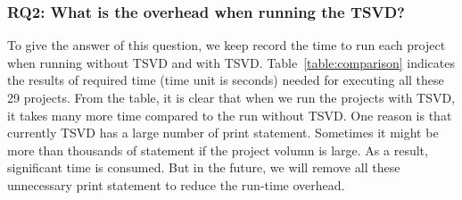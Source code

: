 \subsubsection{RQ2: What is the overhead when running the TSVD?}
To give the answer of this question, we keep record the time to run each project when
running without TSVD and with TSVD. Table~\ref{table:comparison} indicates the results of
required time (time unit is seconds)  needed for executing all these 29
projects. From the table, it is clear that when we run the projects with TSVD,
it takes many more time compared to the run without TSVD.  One reason is that
currently TSVD has a large number of print statement. Sometimes it might be
more than thousands of statement if the project volumn is large. As a result,
significant time is consumed. But in the future, we will remove all these
unnecessary print statement to reduce the run-time overhead.




